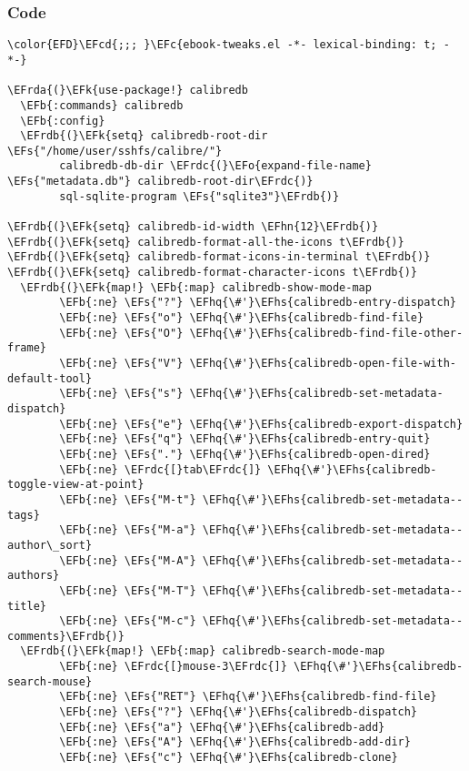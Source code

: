 \documentclass[a4wide,10pt]{article}
\newcommand{\EFc}[1]{\textcolor{EFc}{#1}} %
\newcommand{\EFcd}[1]{\textcolor{EFcd}{#1}} %
\newcommand{\EFs}[1]{\textcolor{EFs}{#1}} %
\newcommand{\EFk}[1]{\textcolor{EFk}{#1}} %
\newcommand{\EFb}[1]{\textcolor{EFb}{#1}} %
\newcommand{\EFo}[1]{\textcolor{EFo}{#1}} %
\newcommand{\EFhn}[1]{\textcolor{EFhn}{\textbf{#1}}} %
\newcommand{\EFhq}[1]{\textcolor{EFhq}{#1}} %
\newcommand{\EFhs}[1]{\textcolor{EFhs}{#1}} %
\newcommand{\EFrda}[1]{\textcolor{EFrda}{#1}} %
\newcommand{\EFrdb}[1]{\textcolor{EFrdb}{#1}} %
\newcommand{\EFrdc}[1]{\textcolor{EFrdc}{#1}} %
\begin{document}
\subsubsection{Code}
\label{sec:org720e8b8}
\begin{Code}
\begin{Verbatim}
\color{EFD}\EFcd{;;; }\EFc{ebook-tweaks.el -*- lexical-binding: t; -*-}

\EFrda{(}\EFk{use-package!} calibredb
  \EFb{:commands} calibredb
  \EFb{:config}
  \EFrdb{(}\EFk{setq} calibredb-root-dir \EFs{"/home/user/sshfs/calibre/"}
        calibredb-db-dir \EFrdc{(}\EFo{expand-file-name} \EFs{"metadata.db"} calibredb-root-dir\EFrdc{)}
        sql-sqlite-program \EFs{"sqlite3"}\EFrdb{)}

\EFrdb{(}\EFk{setq} calibredb-id-width \EFhn{12}\EFrdb{)}
\EFrdb{(}\EFk{setq} calibredb-format-all-the-icons t\EFrdb{)}
\EFrdb{(}\EFk{setq} calibredb-format-icons-in-terminal t\EFrdb{)}
\EFrdb{(}\EFk{setq} calibredb-format-character-icons t\EFrdb{)}
  \EFrdb{(}\EFk{map!} \EFb{:map} calibredb-show-mode-map
        \EFb{:ne} \EFs{"?"} \EFhq{\#'}\EFhs{calibredb-entry-dispatch}
        \EFb{:ne} \EFs{"o"} \EFhq{\#'}\EFhs{calibredb-find-file}
        \EFb{:ne} \EFs{"O"} \EFhq{\#'}\EFhs{calibredb-find-file-other-frame}
        \EFb{:ne} \EFs{"V"} \EFhq{\#'}\EFhs{calibredb-open-file-with-default-tool}
        \EFb{:ne} \EFs{"s"} \EFhq{\#'}\EFhs{calibredb-set-metadata-dispatch}
        \EFb{:ne} \EFs{"e"} \EFhq{\#'}\EFhs{calibredb-export-dispatch}
        \EFb{:ne} \EFs{"q"} \EFhq{\#'}\EFhs{calibredb-entry-quit}
        \EFb{:ne} \EFs{"."} \EFhq{\#'}\EFhs{calibredb-open-dired}
        \EFb{:ne} \EFrdc{[}tab\EFrdc{]} \EFhq{\#'}\EFhs{calibredb-toggle-view-at-point}
        \EFb{:ne} \EFs{"M-t"} \EFhq{\#'}\EFhs{calibredb-set-metadata--tags}
        \EFb{:ne} \EFs{"M-a"} \EFhq{\#'}\EFhs{calibredb-set-metadata--author\_sort}
        \EFb{:ne} \EFs{"M-A"} \EFhq{\#'}\EFhs{calibredb-set-metadata--authors}
        \EFb{:ne} \EFs{"M-T"} \EFhq{\#'}\EFhs{calibredb-set-metadata--title}
        \EFb{:ne} \EFs{"M-c"} \EFhq{\#'}\EFhs{calibredb-set-metadata--comments}\EFrdb{)}
  \EFrdb{(}\EFk{map!} \EFb{:map} calibredb-search-mode-map
        \EFb{:ne} \EFrdc{[}mouse-3\EFrdc{]} \EFhq{\#'}\EFhs{calibredb-search-mouse}
        \EFb{:ne} \EFs{"RET"} \EFhq{\#'}\EFhs{calibredb-find-file}
        \EFb{:ne} \EFs{"?"} \EFhq{\#'}\EFhs{calibredb-dispatch}
        \EFb{:ne} \EFs{"a"} \EFhq{\#'}\EFhs{calibredb-add}
        \EFb{:ne} \EFs{"A"} \EFhq{\#'}\EFhs{calibredb-add-dir}
        \EFb{:ne} \EFs{"c"} \EFhq{\#'}\EFhs{calibredb-clone}

\end{Verbatim}
\end{Code}
\end{document}
